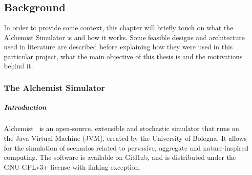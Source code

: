 \chapter{\introductionname}
\label{chap:introduction}
\section{Background}
\label{sec:background}
In order to provide some context, this chapter will briefly touch on what the Alchemist Simulator is and how it works. Some feasible designs and architecture used in literature are described before explaining how they were used in this particular project, what the main objective of this thesis is and the motivations behind it.
\subsection{The Alchemist Simulator}
\label{ssec:the-alchemist-simulator}
\paragraph{Introduction} Alchemist~\cite{alchemist} is an open-source, extensible and stochastic simulator that runs on the Java Virtual Machine (JVM), created by the University of Bologna. It allows for the simulation of scenarios related to pervasive, aggregate and nature-inspired computing. The software is available on GitHub, and is distributed under the GNU GPLv3+ license with linking exception.

